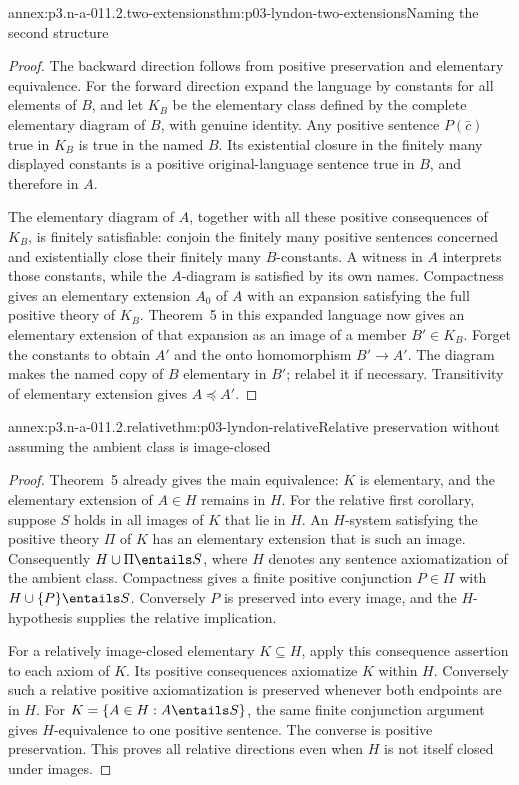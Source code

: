 \begin{annexitem}{annex:p3.n-a-011.2.two-extensions}{thm:p03-lyndon-two-extensions}{Naming the second structure}
\begin{proof}
The backward direction follows from positive preservation and elementary
equivalence. For the forward direction expand the language by constants
for all elements of \(B\), and let \(K_B\) be the elementary class
defined by the complete elementary diagram of \(B\), with genuine
identity. Any positive sentence \(P(\bar c)\) true in \(K_B\) is
true in the named \(B\). Its existential closure in the finitely many
displayed constants is a positive original-language sentence true in
\(B\), and therefore in \(A\).

The elementary diagram of \(A\), together with all these positive
consequences of \(K_B\), is finitely satisfiable: conjoin the finitely
many positive sentences concerned and existentially close their finitely
many \(B\)-constants. A witness in \(A\) interprets those constants,
while the \(A\)-diagram is satisfied by its own names. Compactness
gives an elementary extension \(A_0\) of \(A\) with an expansion
satisfying the full positive theory of \(K_B\). Theorem~5 in this
expanded language now gives an elementary extension of that expansion
as an image of a member \(B'\in K_B\). Forget the constants to obtain
\(A'\) and the onto homomorphism \(B'\to A'\). The diagram makes
the named copy of \(B\) elementary in \(B'\); relabel it if necessary.
Transitivity of elementary extension gives \(A\preccurlyeq A'\).
\end{proof}
\end{annexitem}

\begin{annexitem}{annex:p3.n-a-011.2.relative}{thm:p03-lyndon-relative}{Relative preservation without assuming the ambient class is image-closed}
\begin{proof}
Theorem~5 already gives the main equivalence: \(K\) is elementary,
and the elementary extension of \(A\in H\) remains in \(H\).
For the relative first corollary, suppose \(S\) holds in all images
of \(K\) that lie in \(H\). An \(H\)-system satisfying the positive
theory \(\Pi\) of \(K\) has an elementary extension that is such
an image. Consequently \(H\cup\Pi\entails S\), where \(H\)
denotes any sentence axiomatization of the ambient class. Compactness
gives a finite positive conjunction \(P\in\Pi\) with
\(H\cup\{P\}\entails S\). Conversely \(P\) is preserved into
every image, and the \(H\)-hypothesis supplies the relative implication.

For a relatively image-closed elementary \(K\subseteq H\), apply
this consequence assertion to each axiom of \(K\). Its positive
consequences axiomatize \(K\) within \(H\). Conversely such a
relative positive axiomatization is preserved whenever both endpoints
are in \(H\). For \(K=\{A\in H:A\entails S\}\), the same finite
conjunction argument gives \(H\)-equivalence to one positive sentence.
The converse is positive preservation. This proves all relative
directions even when \(H\) is not itself closed under images.
\end{proof}
\end{annexitem}

